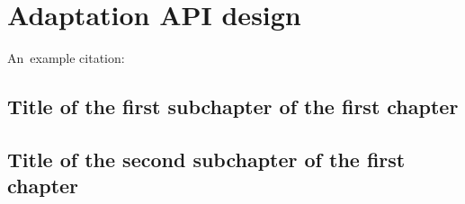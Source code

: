 \chapter{Adaptation API design}

An~example citation: \cite{Andel07}

\section{Title of the first subchapter of the first chapter}

\section{Title of the second subchapter of the first chapter}
